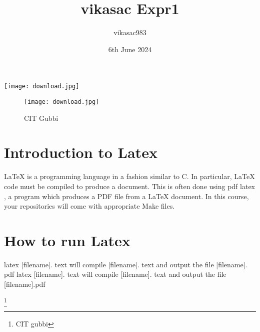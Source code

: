 \documentclass[a4paper,12pt]{article}
\title{vikasac Expr1}
\author{vikasac983 }
\date{6th June 2024}
\begin{document}
\texttt{[image: download.jpg]}
\begin{figure}
    \centering
    \texttt{[image: download.jpg]}
    \caption{CIT Gubbi}
    \label{fig:enter-label}
\end{figure}
\maketitle

\section{Introduction to Latex} 
LaTeX is a programming language in a fashion similar to C. In particular, LaTeX code must be compiled to produce a document. This is often done using pdf latex , a program which produces a PDF file from a LaTeX document. In this course, your repositories will come with appropriate Make files.

\section{How to run Latex}
latex [filename]. text will compile [filename]. text and output the file [filename]. 
pdf latex [filename]. text will compile [filename]. text and output the file [filename].pdf


\footnote{CIT gubbi}
\end{document}
